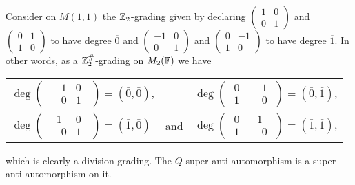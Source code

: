 \begin{ex}\label{ex:supertransp-graded-new}
    Consider on $M(1,1)$ the $\mathbb{Z}_2$-grading given by declaring 
    $\begin{pmatrix}
       1 & 0 \\
       0 & 1
     \end{pmatrix}$ and
     $\begin{pmatrix}
       0 & 1 \\
       1 & 0
     \end{pmatrix}$ to have degree $\overline 0$ and
     $\begin{pmatrix}
       -1 & 0 \\
       0 & 1
     \end{pmatrix}$ and
     $\begin{pmatrix}
       0 & -1 \\
       1 & 0
     \end{pmatrix}$ to have degree $\overline 1$. In other words, as a $\mathbb{Z}_2^\#$-grading on $M_2(\mathbb{F})$ we have\\
     \begin{center}
     \begin{tabular}{ l c r }
     $\deg \begin{pmatrix}
      \phantom{-}1 & 0\phantom{..} \\
      \phantom{-}0 & 1\phantom{..}
     \end{pmatrix} = (\bar 0, \bar 0)$, && $\deg \begin{pmatrix}
      \phantom{.}0 & \phantom{-}1\phantom{.} \\
      \phantom{.}1 & \phantom{-}0\phantom{.}
     \end{pmatrix} = (\bar 0, \bar 1)$,\\
     $\deg \begin{pmatrix}
      -1 & 0\phantom{..} \\
       \phantom{-}0 & 1\phantom{..}
     \end{pmatrix} = (\bar 1, \bar 0)$ &
     and
     & $\deg \begin{pmatrix}
      \phantom{.}0 & -1\phantom{.} \\
      \phantom{.}1 & \phantom{-}0\phantom{.}
     \end{pmatrix} = (\bar 1, \bar 1)$,
     \end{tabular}
     \end{center}
     which is clearly a division grading.
     The $Q$-super-anti-automorphism is a super-anti-automorphism on it.
\end{ex}

